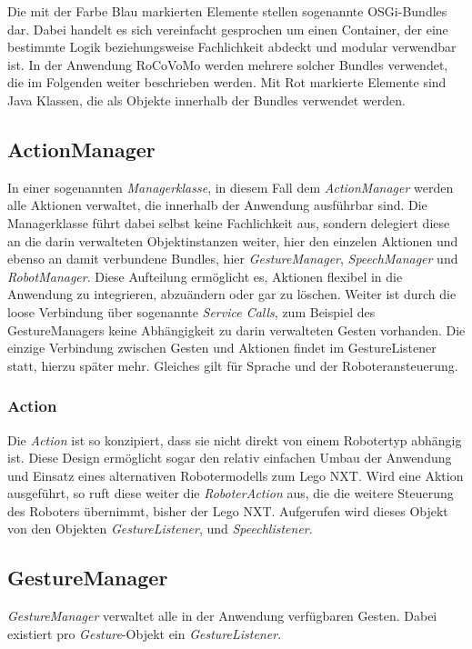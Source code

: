 Die mit der Farbe Blau markierten Elemente stellen sogenannte \gls{OSGi}-Bundles dar. Dabei handelt es sich vereinfacht gesprochen um einen Container, der eine bestimmte Logik beziehungsweise Fachlichkeit abdeckt und modular verwendbar ist. In der Anwendung RoCoVoMo werden mehrere solcher Bundles verwendet, die im Folgenden weiter beschrieben werden. Mit Rot markierte Elemente sind Java Klassen, die als Objekte innerhalb der Bundles verwendet werden.

\subsection{ActionManager}
In einer sogenannten \textit{Managerklasse}, in diesem Fall dem \textit{ActionManager} werden alle Aktionen verwaltet, die innerhalb der Anwendung ausf\"uhrbar sind. Die Managerklasse f\"uhrt dabei selbst keine Fachlichkeit aus, sondern delegiert diese an die darin verwalteten Objektinstanzen weiter, hier den einzelen Aktionen und ebenso an damit verbundene Bundles, hier \textit{GestureManager}, \textit{SpeechManager} und \textit{RobotManager}.
\newline
Diese Aufteilung erm\"oglicht es, Aktionen flexibel in die Anwendung zu integrieren, abzu\"andern oder gar zu l\"oschen. Weiter ist durch die loose Verbindung \"uber sogenannte \textit{Service Calls}, zum Beispiel des GestureManagers keine Abh\"angigkeit zu darin verwalteten Gesten vorhanden. Die einzige Verbindung zwischen Gesten und Aktionen findet im GestureListener statt, hierzu sp\"ater mehr.
\newline
Gleiches gilt f\"ur Sprache und der Roboteransteuerung.

\subsubsection{Action}
Die \textit{Action} ist so konzipiert, dass sie nicht direkt von einem Robotertyp abh\"angig ist. Diese Design erm\"oglicht sogar den relativ einfachen Umbau der Anwendung und Einsatz eines alternativen Robotermodells zum Lego NXT.
\newline
Wird eine Aktion ausgef\"uhrt, so ruft diese weiter die \textit{RoboterAction} aus, die die weitere Steuerung des Roboters \"ubernimmt, bisher der Lego NXT. Aufgerufen wird dieses Objekt von den Objekten \textit{GestureListener}, und \textit{Speechlistener}.

\subsection{GestureManager}
\textit{GestureManager} verwaltet alle in der Anwendung verf\"ugbaren Gesten. Dabei existiert pro \textit{Gesture}-Objekt ein \textit{GestureListener}.

